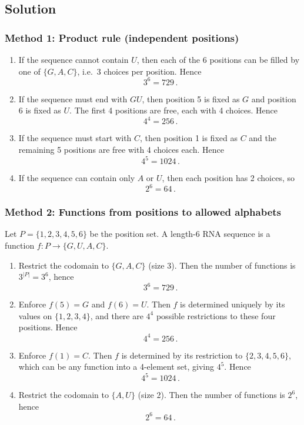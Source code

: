 \documentclass[12pt]{article}
\begin{document}
\subsection{Solution}

\subsubsection{Method 1: Product rule (independent positions)}
\begin{enumerate}[label=(\alph*)]
\item If the sequence cannot contain $U$, then each of the 6 positions can be filled by one of $\{G,A,C\}$, i.e.\ 3 choices per position. Hence
\[
\boxed{\,3^6 = 729\,}.
\]

\item If the sequence must end with $GU$, then position 5 is fixed as $G$ and position 6 is fixed as $U$. The first 4 positions are free, each with 4 choices. Hence
\[
\boxed{\,4^4 = 256\,}.
\]

\item If the sequence must start with $C$, then position 1 is fixed as $C$ and the remaining 5 positions are free with 4 choices each. Hence
\[
\boxed{\,4^5 = 1024\,}.
\]

\item If the sequence can contain only $A$ or $U$, then each position has 2 choices, so
\[
\boxed{\,2^6 = 64\,}.
\]
\end{enumerate}

\subsubsection{Method 2: Functions from positions to allowed alphabets}
Let $P=\{1,2,3,4,5,6\}$ be the position set. A length-6 RNA sequence is a function $f:P\to \{G,U,A,C\}$.

\begin{enumerate}[label=(\alph*)]
\item Restrict the codomain to $\{G,A,C\}$ (size 3). Then the number of functions is $3^{|P|}=3^6$, hence
\[
\boxed{\,3^6 = 729\,}.
\]

\item Enforce $f(5)=G$ and $f(6)=U$. Then $f$ is determined uniquely by its values on $\{1,2,3,4\}$, and there are $4^4$ possible restrictions to these four positions. Hence
\[
\boxed{\,4^4 = 256\,}.
\]

\item Enforce $f(1)=C$. Then $f$ is determined by its restriction to $\{2,3,4,5,6\}$, which can be any function into a 4-element set, giving $4^5$. Hence
\[
\boxed{\,4^5 = 1024\,}.
\]

\item Restrict the codomain to $\{A,U\}$ (size 2). Then the number of functions is $2^6$, hence
\[
\boxed{\,2^6 = 64\,}.
\]
\end{enumerate}
\end{document}

